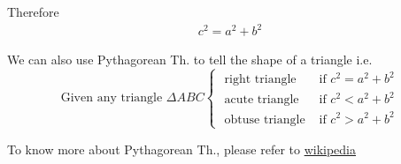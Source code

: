 \documentclass{article} %
\begin{document}
Therefore
\begin{align*}
    c^2 = a^2 + b^2
\end{align*}

We can also use Pythagorean Th. to tell the shape of a triangle i.e.
\begin{equation*}
    \text{Given any triangle }\Delta ABC 
    \begin{cases}
    \text{ right triangle }& \text{if } c^2 = a^2 + b^2\\
    \text{ acute triangle }& \text{if } c^2 < a^2 + b^2\\
    \text{ obtuse triangle }& \text{if } c^2 > a^2 + b^2
    \end{cases}
\end{equation*}

To know more about Pythagorean Th., please refer to \href{https://www.wikiwand.com/en/Pythagorean_theorem}{wikipedia}


\clearpage


\end{document}
